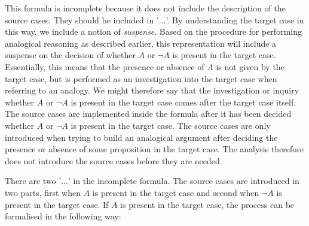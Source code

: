 				\noindent\begin{minipage}{0.9\textwidth}
				\end{minipage}\medskip

		This formula is incomplete because it does not include the description of the source cases. They should be included in '$...$'. By understanding the target case in this way, we include a notion of \textit{suspense}. Based on the procedure for performing analogical reasoning as described earlier, this representation will include a suspense on the decision of whether $A$ or $\neg A$ is present in the target case. Essentially, this means that the presence or absence of $A$ is not given by the target case, but is performed as an investigation into the target case when referring to an analogy. We might therefore say that the investigation or inquiry whether $A$ or $\neg A$ is present in the target case comes after the target case itself. The source cases are implemented inside the formula after it has been decided whether $A$ or $\neg A$ is present in the target case. The source cases are only introduced when trying to build an analogical argument after deciding the presence or absence of some proposition in the target case. The analysis therefore does not introduce the source cases before they are needed. 
		
		
		There are two '$...$' in the incomplete formula. The source cases are introduced in two parts, first when $A$ is present in the target case and second when $\neg A$ is present in the target case. If $A$ is present in the target case, the process can be formalised in the following way: \medskip
				
				\noindent\begin{minipage}{0.9\textwidth}
				\end{minipage}\medskip	
		
